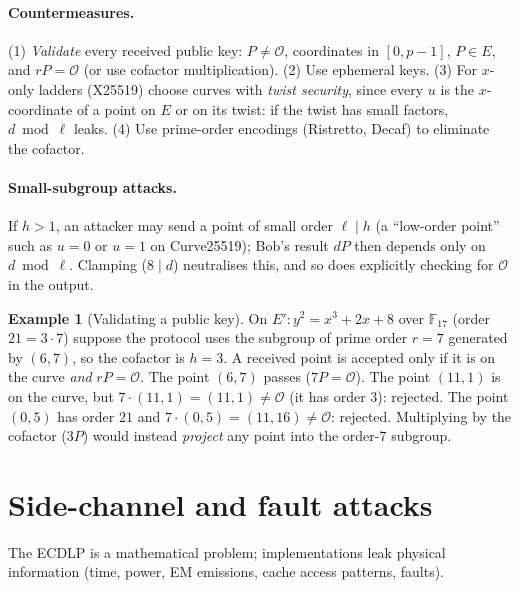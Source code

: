 \documentclass[11pt,a4paper,oneside]{book}
\theoremstyle{plain}
\theoremstyle{definition}
\newtheorem{example}[theorem]{Example}
\theoremstyle{remark}
\newcommand{\F}{\mathbb{F}}
\newcommand{\Oinf}{\mathcal{O}}
\begin{document}
\paragraph{Countermeasures.} (1) \emph{Validate} every received public key: $P\ne\Oinf$, coordinates in $[0,p-1]$, $P\in E$, and $rP=\Oinf$ (or use cofactor multiplication). (2) Use ephemeral keys. (3) For $x$-only ladders (X25519) choose curves with \emph{twist security}, since every $u$ is the $x$-coordinate of a point on $E$ or on its twist: if the twist has small factors, $d\bmod\ell$ leaks. (4) Use prime-order encodings (Ristretto, Decaf) to eliminate the cofactor.

\paragraph{Small-subgroup attacks.} If $h>1$, an attacker may send a point of small order $\ell\mid h$ (a ``low-order point'' such as $u=0$ or $u=1$ on Curve25519); Bob's result $dP$ then depends only on $d\bmod\ell$. Clamping ($8\mid d$) neutralises this, and so does explicitly checking for $\Oinf$ in the output.

\begin{example}[Validating a public key]
On $E':y^2=x^3+2x+8$ over $\F_{17}$ (order $21=3\cdot7$) suppose the protocol uses the subgroup of prime order $r=7$ generated by $(6,7)$, so the cofactor is $h=3$. A received point is accepted only if it is on the curve \emph{and} $rP=\Oinf$. The point $(6,7)$ passes ($7P=\Oinf$). The point $(11,1)$ is on the curve, but $7\cdot(11,1)=(11,1)\ne\Oinf$ (it has order $3$): rejected. The point $(0,5)$ has order $21$ and $7\cdot(0,5)=(11,16)\ne\Oinf$: rejected. Multiplying by the cofactor ($3P$) would instead \emph{project} any point into the order-$7$ subgroup.
\end{example}

\section{Side-channel and fault attacks}\label{sec:sidechannel}

The ECDLP is a mathematical problem; implementations leak physical information (time, power, EM emissions, cache access patterns, faults).
\end{document}
